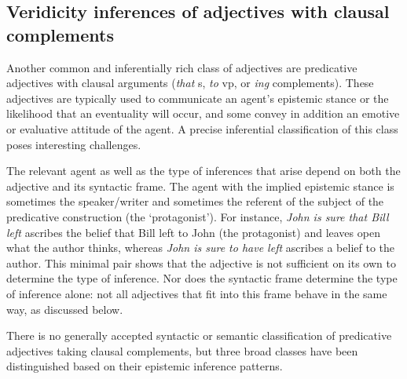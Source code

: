 \documentclass[10pt]{article}
\begin{document}
\vspace {-3mm}

\subsection{Veridicity inferences of adjectives with clausal complements}
\vspace {-2mm}

Another common and inferentially rich class of adjectives are predicative adjectives with clausal arguments (\emph{that} {\sc s}, \emph{to} {\sc vp}, or \emph{ing} complements). These adjectives are typically used to communicate an agent's epistemic stance or the likelihood that an eventuality will occur, and some convey in addition an emotive or evaluative attitude of the agent. 
A precise inferential classification of this class poses interesting challenges.

The relevant agent as well as the type of inferences that arise depend
on both the adjective and its syntactic frame.  The agent with the
implied epistemic stance is sometimes the speaker/writer and sometimes
the referent of the subject of the predicative construction (the
`protagonist').  For instance, \textit{John is sure that Bill left}
ascribes the belief that Bill left to John (the protagonist) and
leaves open what the author thinks, whereas \textit{John is sure to have
left} ascribes a belief to the author. This minimal pair shows that the adjective is not sufficient on its own to determine the type of inference. 
Nor does the syntactic frame determine the type of inference alone: not all adjectives that fit into this frame behave in the same way, as discussed below.

There is no generally accepted syntactic or semantic classification of predicative adjectives taking clausal complements, but three broad classes have been distinguished based on their epistemic inference patterns. 

\vspace{-.2in}
\end{document}
